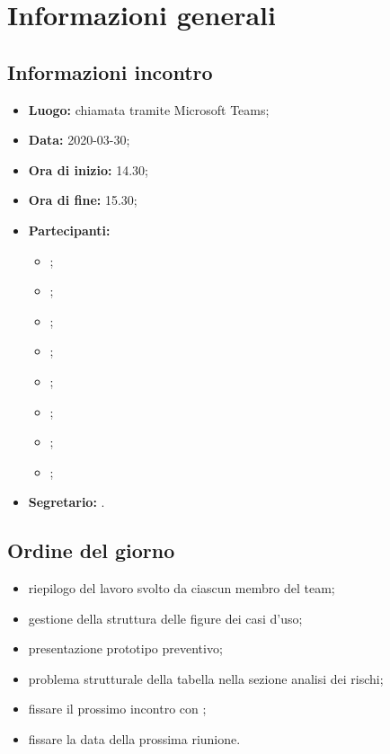 \section{Informazioni generali}
\subsection{Informazioni incontro}
\begin{itemize}
	\item \textbf{Luogo:} chiamata tramite Microsoft Teams; 
	\item \textbf{Data:} 2020-03-30;
	\item \textbf{Ora di inizio:} 14.30; 
	\item \textbf{Ora di fine:} 15.30; 
	\item \textbf{Partecipanti:}
		\begin{itemize}
			\item \VB; 
			\item \LB; 
			\item \NF; 
			\item \EG; 
			\item \FJ; 
			\item \MP; 
			\item \AS; 
			\item \AZ; 
		\end{itemize}
	\item \textbf{Segretario:} \AZ. 
\end{itemize}

\subsection{Ordine del giorno}
\begin{itemize}
	\item riepilogo del lavoro svolto da ciascun membro del team;
	\item gestione della struttura delle figure dei casi d'uso;
	\item presentazione prototipo preventivo;
	\item problema strutturale della tabella nella sezione analisi dei rischi;
	\item fissare il prossimo incontro con \Proponente{};
	\item fissare la data della prossima riunione.
\end{itemize}
